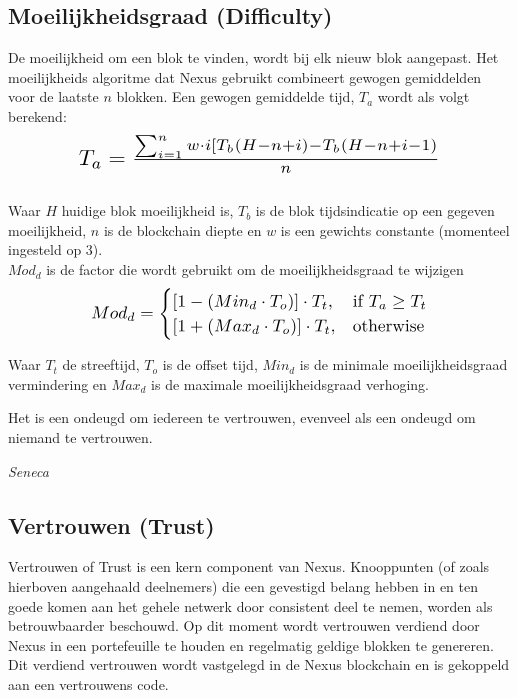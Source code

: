 \documentclass[11pt]{article}
\begin{document}
\subsection{Moeilijkheidsgraad (Difficulty)}

De moeilijkheid om een ​​blok te vinden, wordt bij elk nieuw blok aangepast. Het moeilijkheids algoritme dat Nexus gebruikt combineert gewogen gemiddelden voor de laatste $n$ blokken.
Een gewogen gemiddelde tijd, $T_a$ wordt als volgt berekend:\\ 

\begin{equation}
\resizebox{.75\hsize}{!}{$T_{a} = \frac{\sum_{i=1}^{n} w \cdot i [ T_b(H - n + i) - T_b(H-n+i-1) }{n}$}
\end{equation}\\ 

\noindent Waar $H$ huidige blok moeilijkheid is, $T_b$ is de blok tijdsindicatie op een gegeven moeilijkheid, $n$ is de blockchain diepte en $w$ is een gewichts constante (momenteel ingesteld op 3).\\  

\noindent $Mod_d$ is de factor die wordt gebruikt om de moeilijkheidsgraad te wijzigen\\ 

\begin{equation}
\resizebox{.70\hsize}{!}{$
    Mod_d= 
\begin{cases}
    [1 - (Min_{d} \cdot T_{o})] \cdot T_{t}, & \text{if } T_{a} \geq T_{t}\\
    [1 + (Max_{d} \cdot T_{o})] \cdot T_{t}, & \text{otherwise}
\end{cases}
$}
\end{equation}

\noindent Waar $T_t$ de streeftijd, $T_o$ is de offset tijd, $Min_d$ is de minimale moeilijkheidsgraad vermindering en $Max_d$ is de maximale moeilijkheidsgraad verhoging.

\epigraph{Het is een ondeugd om iedereen te vertrouwen, evenveel als een ondeugd om niemand te vertrouwen.
}{\textit{\footnotesize{Seneca}}}

\pagebreak
\subsection{Vertrouwen (Trust)}\label{subsection:Trust}

Vertrouwen of Trust is een kern component van Nexus. Knooppunten (of zoals hierboven aangehaald deelnemers) die een gevestigd belang hebben in en ten goede komen aan het gehele netwerk door consistent deel te nemen, worden als betrouwbaarder beschouwd. Op dit moment wordt vertrouwen verdiend door Nexus in een portefeuille te houden en regelmatig geldige blokken te genereren. Dit verdiend vertrouwen wordt vastgelegd in de Nexus blockchain en is gekoppeld aan een vertrouwens code.\\ 
\end{document}
